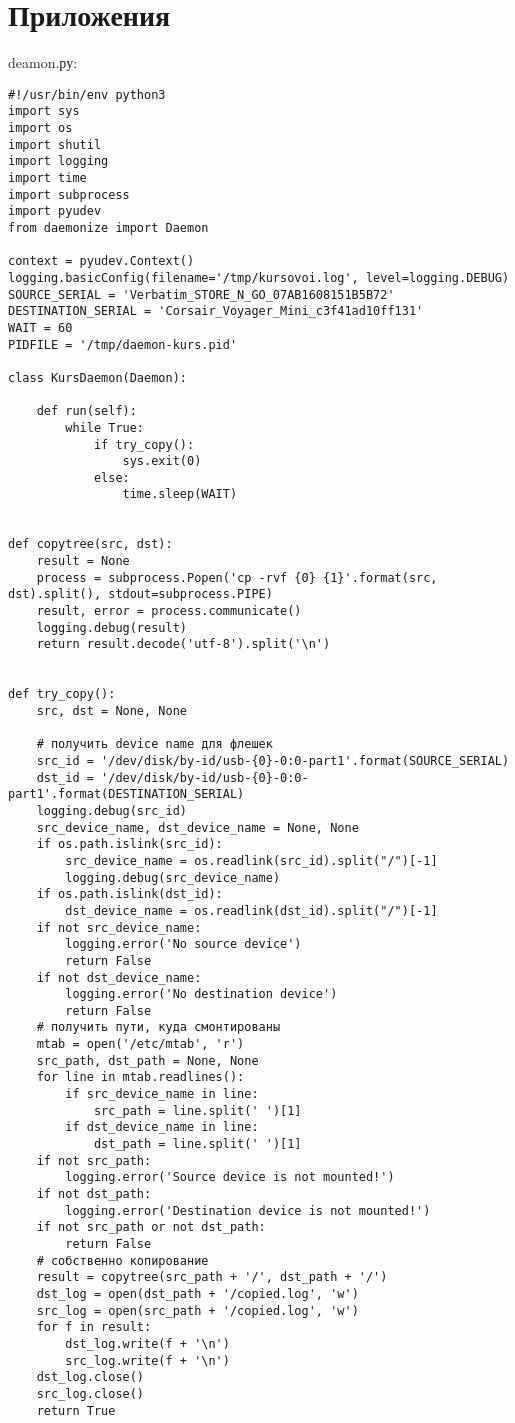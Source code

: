 \documentclass[12pt,a4paper]{scrartcl}
\begin{document}
\section{Приложения}
deamon.ру:\begin{verbatim}
#!/usr/bin/env python3
import sys
import os
import shutil
import logging
import time
import subprocess
import pyudev
from daemonize import Daemon
 
context = pyudev.Context()
logging.basicConfig(filename='/tmp/kursovoi.log', level=logging.DEBUG)
SOURCE_SERIAL = 'Verbatim_STORE_N_GO_07AB1608151B5B72'
DESTINATION_SERIAL = 'Corsair_Voyager_Mini_c3f41ad10ff131'
WAIT = 60
PIDFILE = '/tmp/daemon-kurs.pid'
 
class KursDaemon(Daemon):
 
    def run(self):
        while True:
            if try_copy():
                sys.exit(0)
            else:
                time.sleep(WAIT)
 
 
def copytree(src, dst):
    result = None
    process = subprocess.Popen('cp -rvf {0} {1}'.format(src, dst).split(), stdout=subprocess.PIPE)
    result, error = process.communicate()
    logging.debug(result)
    return result.decode('utf-8').split('\n')
 
 
def try_copy():
    src, dst = None, None
 
    # получить device name для флешек
    src_id = '/dev/disk/by-id/usb-{0}-0:0-part1'.format(SOURCE_SERIAL)
    dst_id = '/dev/disk/by-id/usb-{0}-0:0-part1'.format(DESTINATION_SERIAL)
    logging.debug(src_id)
    src_device_name, dst_device_name = None, None
    if os.path.islink(src_id):
        src_device_name = os.readlink(src_id).split("/")[-1]
        logging.debug(src_device_name)
    if os.path.islink(dst_id):
        dst_device_name = os.readlink(dst_id).split("/")[-1]
    if not src_device_name:
        logging.error('No source device')
        return False
    if not dst_device_name:
        logging.error('No destination device')
        return False
    # получить пути, куда смонтированы
    mtab = open('/etc/mtab', 'r')
    src_path, dst_path = None, None
    for line in mtab.readlines():
        if src_device_name in line:
            src_path = line.split(' ')[1]
        if dst_device_name in line:
            dst_path = line.split(' ')[1]
    if not src_path:
        logging.error('Source device is not mounted!')
    if not dst_path:
        logging.error('Destination device is not mounted!')
    if not src_path or not dst_path:
        return False
    # собственно копирование
    result = copytree(src_path + '/', dst_path + '/')
    dst_log = open(dst_path + '/copied.log', 'w')
    src_log = open(src_path + '/copied.log', 'w')
    for f in result:
        dst_log.write(f + '\n')
        src_log.write(f + '\n')
    dst_log.close()
    src_log.close()
    return True
 

\end{verbatim}
\end{document}
